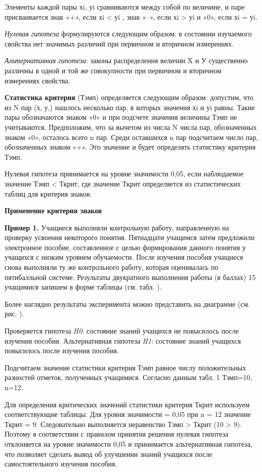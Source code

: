 \documentclass[12pt]{article}
\begin{document}
Элементы каждой пары хi, уi сравниваются между собой по величине, и паре присваивается знак «+», если хi < уi , знак «–», если хi > уi  и «0», если хi = уi.

\textit{Нулевая гипотеза} формулируются следующим образом: в состоянии изучаемого свойства нет значимых различий при первичном и вторичном измерениях.

\textit{Альтернативная гипотеза}: законы распределения величин X и У существенно различны в одной и той же совокупности при первичном и вторичном измерениях свойства.

\bigskip
\textbf{Статистика критерия} (Тэмп) определяется следующим образом:
допустим, что из N пар (х, у,) нашлось несколько пар, в которых значения хi  и уi равны. Такие пары обозначаются знаком «0» и при подсчете значения величины Тэмп не учитываются. Предположим, что за вычетом из числа N числа пар, обозначенных знаком «0», осталось всего n пар. Среди оставшихся n пар подсчитаем число пар, обозначенных знаком «+». Это значение и будет определять статистику критерия Тэмп.

Нулевая гипотеза принимается на уровне значимости 0,05, если наблюдаемое значение Тэмп < Ткрит, где значение Ткрит определяется из статистических таблиц для критерия знаков.

\medskip
\textbf{Применение критерия знаков}

\medskip
\textbf{Пример 1.} Учащиеся выполняли контрольную работу, направленную на проверку усвоения некоторого понятия. Пятнадцати учащимся затем предложили электронное пособие, составленное с целью формирования данного понятия у учащихся с низким уровнем обучаемости. После изучения пособия учащиеся снова выполняли ту же контрольного работу, которая оценивалась по пятибалльной системе.
Результаты двукратного выполнения работы (в баллах) 15 учащимися запишем в форме таблицы (см. табл. ).

Более наглядно результаты эксперимента можно представить на диаграмме (см. рис. ).
 
Проверяется гипотеза \textit{H0}: состояние знаний учащихся не повысилось после изучения пособия. Альтернативная гипотеза \textit{H1}: состояние знаний учащихся повысилось после изучения пособия.

Подсчитаем значение статистики критерия Тэмп равное числу положительных разностей отметок, полученных учащимися. Согласно данным табл. 1 Тэмп=10, n=12.

Для определения критических значений статистики критерия Ткрит используем соответствующие таблицы. Для уровня значимости  = 0,05 при n = 12 значение Ткрит = 9. Следовательно выполняется неравенство Тэмп > Ткрит (10 > 9). Поэтому в соответствии с правилом принятия решения нулевая гипотеза отклоняется на уровне значимости 0,05 и принимается альтернативная гипотеза, что позволяет сделать вывод об улучшении знаний учащихся после самостоятельного изучения пособия.
\end{document}
